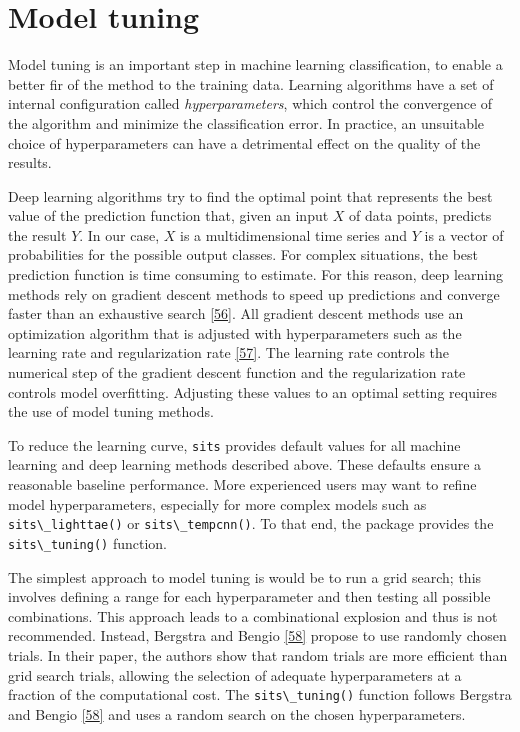 \documentclass[
  11pt,
]{report}
\newcommand{\passthrough}[1]{#1}
\begin{document}
\hypertarget{model-tuning}{%
\section*{Model tuning}\label{model-tuning}}

Model tuning is an important step in machine learning classification, to
enable a better fir of the method to the training data. Learning
algorithms have a set of internal configuration called
\emph{hyperparameters}, which control the convergence of the algorithm
and minimize the classification error. In practice, an unsuitable choice
of hyperparameters can have a detrimental effect on the quality of the
results.

Deep learning algorithms try to find the optimal point that represents
the best value of the prediction function that, given an input \(X\) of
data points, predicts the result \(Y\). In our case, \(X\) is a
multidimensional time series and \(Y\) is a vector of probabilities for
the possible output classes. For complex situations, the best prediction
function is time consuming to estimate. For this reason, deep learning
methods rely on gradient descent methods to speed up predictions and
converge faster than an exhaustive search
\protect\hyperlink{ref-Bengio2012}{{[}56{]}}. All gradient descent
methods use an optimization algorithm that is adjusted with
hyperparameters such as the learning rate and regularization rate
\protect\hyperlink{ref-Schmidt2021}{{[}57{]}}. The learning rate
controls the numerical step of the gradient descent function and the
regularization rate controls model overfitting. Adjusting these values
to an optimal setting requires the use of model tuning methods.

To reduce the learning curve, \passthrough{\lstinline!sits!} provides
default values for all machine learning and deep learning methods
described above. These defaults ensure a reasonable baseline
performance. More experienced users may want to refine model
hyperparameters, especially for more complex models such as
\passthrough{\lstinline!sits\_lighttae()!} or
\passthrough{\lstinline!sits\_tempcnn()!}. To that end, the package
provides the \passthrough{\lstinline!sits\_tuning()!} function.

The simplest approach to model tuning is would be to run a grid search;
this involves defining a range for each hyperparameter and then testing
all possible combinations. This approach leads to a combinational
explosion and thus is not recommended. Instead, Bergstra and Bengio
\protect\hyperlink{ref-Bergstra2012}{{[}58{]}} propose to use randomly
chosen trials. In their paper, the authors show that random trials are
more efficient than grid search trials, allowing the selection of
adequate hyperparameters at a fraction of the computational cost. The
\passthrough{\lstinline!sits\_tuning()!} function follows Bergstra and
Bengio \protect\hyperlink{ref-Bergstra2012}{{[}58{]}} and uses a random
search on the chosen hyperparameters.
\end{document}
